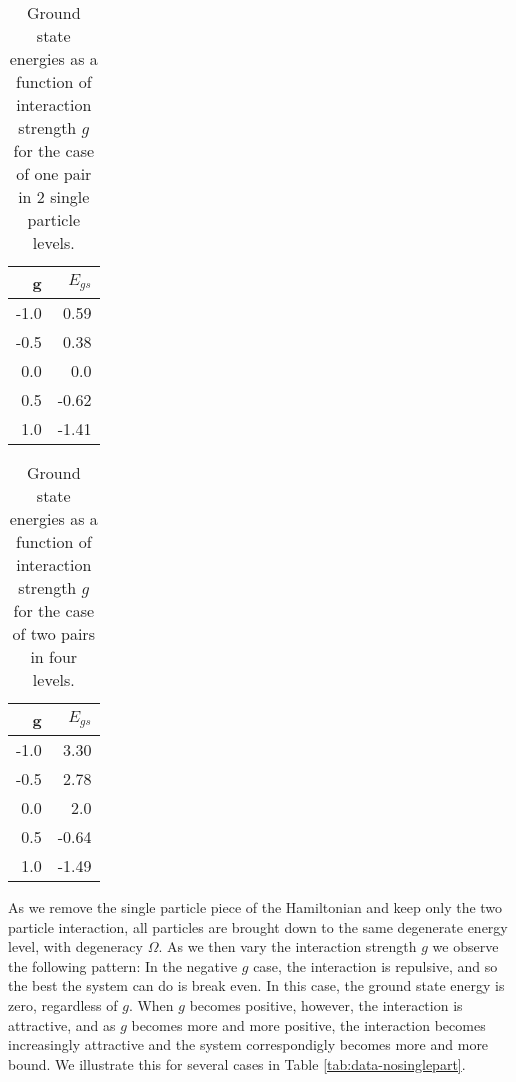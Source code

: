 \documentclass[11pt]{article}
\begin{document}
\begin{table}[h]
\begin{center}
\begin{tabular}{|r|r|}
\hline
  g   &  $E_{gs}$ \\ \hline
-1.0  &  0.59 \\
-0.5  &  0.38 \\
 0.0  &  0.0 \\
 0.5  &  -0.62 \\
 1.0  &  -1.41 \\
\hline
\end{tabular}
\end{center}
\caption{Ground state energies as a function of interaction strength $g$ for the case of one pair in 2 single particle levels.}
\label{tab:1pr2lvl}
\end{table}


\begin{table}[h]
\begin{center}
	\begin{tabular}{|r|r|}
\hline
	g   &  $E_{gs}$ \\ \hline
	-1.0  &  3.30 \\
	-0.5  &  2.78 \\
	 0.0  &  2.0 \\
	 0.5  &  -0.64 \\
	 1.0  &  -1.49 \\
\hline
	\end{tabular}
\end{center}
	\caption{Ground state energies as a function of interaction strength $g$ for the case of two pairs in four levels.}
	\label{tab:2pr4lvl}
\end{table}





As we remove the single particle piece of the Hamiltonian and keep only
the two particle interaction, all particles are brought down to the same
degenerate energy level, with degeneracy $\Omega$. As we then vary the
interaction strength $g$ we observe the following pattern: In the
negative $g$ case, the interaction is repulsive, and so the best the
system can do is break even. In this case, the ground state energy is
zero, regardless of $g$. When $g$ becomes positive, however, the
interaction is attractive, and as $g$ becomes more and more positive,
the interaction becomes increasingly attractive and the system
correspondigly becomes more and more bound. We illustrate this for
several cases in Table \ref{tab:data-nosinglepart}.
\end{document}
